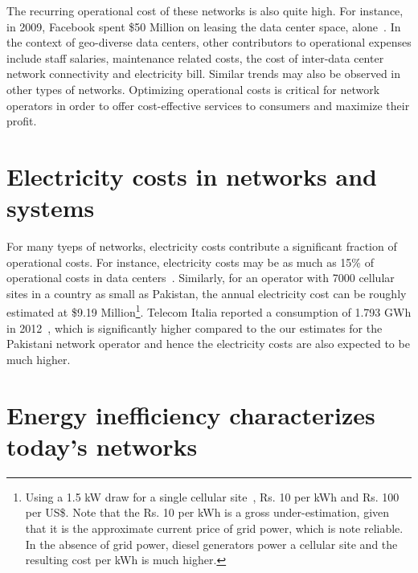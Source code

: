 The recurring operational cost of these networks is also quite high. For instance, in 2009, Facebook spent \$50 Million on leasing the data center space, alone~\cite{FBLease}. In the context of geo-diverse data centers, other contributors to operational expenses include staff salaries, maintenance related costs, the cost of inter-data center network connectivity and electricity bill. Similar trends may also be observed in other types of networks. Optimizing operational costs is critical for network operators in order to offer cost-effective services to consumers and maximize their profit.

\section{Electricity costs in networks and systems} 
For many tyeps of networks, electricity costs contribute a significant fraction of operational costs. For instance, electricity costs may be as much as 15\% of operational costs in data centers~\cite{costCloud}. Similarly, for an operator with 7000 cellular sites in a country as small as Pakistan, the annual electricity cost can be roughly estimated at \$9.19 Million\footnote{Using a 1.5 kW draw for a single cellular site~\cite{mbakwe:btshybribpower:2011:necec}, Rs. 10 per kWh and Rs. 100 per US\$. Note that the Rs. 10 per kWh is a gross under-estimation, given that it is the approximate current price of grid power, which is note reliable. In the absence of grid power, diesel generators power a cellular site and the resulting cost per kWh is much higher.}. Telecom Italia reported a consumption of 1.793 GWh in 2012~\cite{TIAnnualReport}, which is significantly higher compared to the our estimates for the Pakistani network operator and hence the electricity costs are also expected to be much higher. 

\section{Energy inefficiency characterizes today's networks} 

